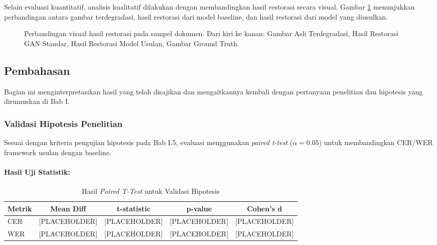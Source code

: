 \documentclass{article}
\begin{document}
Selain evaluasi kuantitatif, analisis kualitatif dilakukan dengan membandingkan hasil restorasi secara visual. Gambar \ref{fig:qualitative_comparison} menunjukkan perbandingan antara gambar terdegradasi, hasil restorasi dari model baseline, dan hasil restorasi dari model yang diusulkan.

\begin{figure}[H]
    \centering
    \caption{Perbandingan visual hasil restorasi pada sampel dokumen. Dari kiri ke kanan: Gambar Asli Terdegradasi, Hasil Restorasi GAN Standar, Hasil Restorasi Model Usulan, Gambar Ground Truth.}
    \label{fig:qualitative_comparison}
\end{figure}

\subsection{Pembahasan}

Bagian ini menginterpretasikan hasil yang telah disajikan dan mengaitkannya kembali dengan pertanyaan penelitian dan hipotesis yang dirumuskan di Bab I.

\subsubsection{Validasi Hipotesis Penelitian}

Sesuai dengan kriteria pengujian hipotesis pada Bab I.5, evaluasi menggunakan \textit{paired t-test} ($\alpha = 0.05$) untuk membandingkan CER/WER framework usulan dengan baseline.

\paragraph{Hasil Uji Statistik:}

\begin{table}[H]
\centering
\caption{Hasil \textit{Paired T-Test} untuk Validasi Hipotesis}
\label{tab:hypothesis-test}
\small
\begin{tabular}{lcccc}
\toprule
\textbf{Metrik} & \textbf{Mean Diff} & \textbf{t-statistic} & \textbf{p-value} & \textbf{Cohen's d} \\
\midrule
CER & [PLACEHOLDER] & [PLACEHOLDER] & [PLACEHOLDER] & [PLACEHOLDER] \\
WER & [PLACEHOLDER] & [PLACEHOLDER] & [PLACEHOLDER] & [PLACEHOLDER] \\
\bottomrule
\end{tabular}
\end{table}
\end{document}

